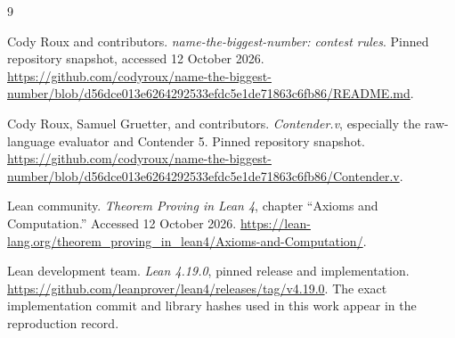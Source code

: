 \documentclass[11pt,letterpaper]{article}
\theoremstyle{definition}
\begin{document}
\begin{thebibliography}{9}
\raggedright
{}
Cody Roux and contributors.
\emph{name-the-biggest-number: contest rules}.
Pinned repository snapshot, accessed 12 October 2026.
\url{https://github.com/codyroux/name-the-biggest-number/blob/d56dce013e6264292533efdc5e1de71863c6fb86/README.md}.

Cody Roux, Samuel Gruetter, and contributors.
\emph{Contender.v}, especially the raw-language evaluator and Contender 5.
Pinned repository snapshot.
\url{https://github.com/codyroux/name-the-biggest-number/blob/d56dce013e6264292533efdc5e1de71863c6fb86/Contender.v}.

Lean community.
\emph{Theorem Proving in Lean 4}, chapter ``Axioms and Computation.''
Accessed 12 October 2026.
\url{https://lean-lang.org/theorem_proving_in_lean4/Axioms-and-Computation/}.

Lean development team.
\emph{Lean 4.19.0}, pinned release and implementation.
\url{https://github.com/leanprover/lean4/releases/tag/v4.19.0}.
The exact implementation commit and library hashes used in this work appear
in the reproduction record.
\end{thebibliography}
\end{document}
